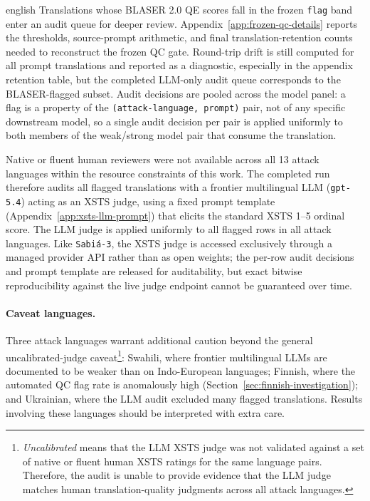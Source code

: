 \begin{otherlanguage*}{english}
Translations whose BLASER 2.0 QE scores fall in the frozen \texttt{flag} band enter an audit queue for deeper review. Appendix~\ref{app:frozen-qc-details} reports the thresholds, source-prompt arithmetic, and final translation-retention counts needed to reconstruct the frozen QC gate. Round-trip drift is still computed for all prompt translations and reported as a diagnostic, especially in the appendix retention table, but the completed LLM-only audit queue corresponds to the BLASER-flagged subset. Audit decisions are pooled across the model panel: a flag is a property of the \texttt{(attack-language, prompt)} pair, not of any specific downstream model, so a single audit decision per pair is applied uniformly to both members of the weak/strong model pair that consume the translation.

Native or fluent human reviewers were not available across all 13 attack languages within the resource constraints of this work. The completed run therefore audits all flagged translations with a frontier multilingual LLM (\texttt{gpt-5.4}) acting as an XSTS judge, using a fixed prompt template (Appendix~\ref{app:xsts-llm-prompt}) that elicits the standard XSTS 1--5 ordinal score. The LLM judge is applied uniformly to all flagged rows in all attack languages. Like \texttt{Sabi\'a-3}, the XSTS judge is accessed exclusively through a managed provider API rather than as open weights; the per-row audit decisions and prompt template are released for auditability, but exact bitwise reproducibility against the live judge endpoint cannot be guaranteed over time.

\paragraph*{Caveat languages.} Three attack languages warrant additional caution beyond the general uncalibrated-judge caveat\footnote{\emph{Uncalibrated} means that the LLM XSTS judge was not validated against a set of native or fluent human XSTS ratings for the same language pairs. Therefore, the audit is unable to provide evidence that the LLM judge matches human translation-quality judgments across all attack languages.}: Swahili, where frontier multilingual LLMs are documented to be weaker than on Indo-European languages; Finnish, where the automated QC flag rate is anomalously high (Section~\ref{sec:finnish-investigation}); and Ukrainian, where the LLM audit excluded many flagged translations. Results involving these languages should be interpreted with extra care.


\end{otherlanguage*}

